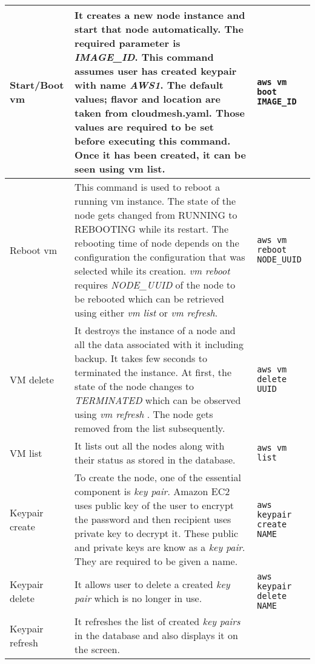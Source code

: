\documentclass[9pt,twocolumn,twoside]{../../styles/osajnl}
\begin{document}
\begin{table*}[p]
\begin{center}
\begin{tabular}{p{2cm}p{10cm}p{5cm}}
  \hline
  Start/Boot vm & It creates a new node instance and start that
                  node automatically. The required parameter is
                  \textit{IMAGE\_ID}. This command assumes user has created keypair
                  with name \textit{AWS1}. The default values; flavor and location are
                  taken from cloudmesh.yaml. Those values are required to be set
                  before executing this command. Once it has been created, it can be
                  seen using vm list.
                         & \verb+aws vm boot IMAGE_ID+ \\
  \hline
  Reboot vm & This command is used to reboot a running vm
              instance. The state of the node gets changed from RUNNING to
              REBOOTING while its restart. The rebooting time of node depends on
              the configuration the configuration that was selected while its
              creation. \textit{vm reboot} requires \textit{NODE\_UUID} of the
              node to be rebooted which can be retrieved using either \textit{vm
              list} or \textit{vm refresh}.
                         & \verb+aws vm reboot NODE_UUID+ \\
  \hline
  VM delete & It destroys the instance of a node and all the data
              associated with it including backup. It takes few seconds to
              terminated the instance. At first, the state of the node changes
              to \textit{TERMINATED} which can be observed using \textit{vm
              refresh} . The node gets removed from the list subsequently.
                         & \verb+aws vm delete UUID+ \\
  \hline
  VM list  & It lists out all the nodes along with their status as stored in the database.
                         & \verb+aws vm list+ \\
  \hline
  Keypair create & To create the node, one of the essential component is \textit{key pair}. Amazon EC2 uses public key of the user to encrypt the password and then recipient uses private key to decrypt it. These public and private keys are know as a \textit{key pair}. They are required to be given a name.
                         & \verb+aws keypair create NAME+ \\
  \hline
  Keypair delete & It allows user to delete a created \textit{key pair} which is no longer in use.
                         & \verb+aws keypair delete NAME+ \\
  \hline
  Keypair refresh & It refreshes the list of created \textit{key pairs} in the database and also displays it on the screen.

\end{tabular}
\end{center}
\end{table*}
\end{document}
